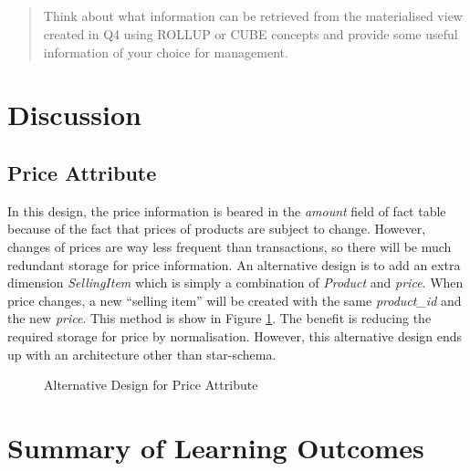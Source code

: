 \documentclass[
  a4paper,
]{article}
\begin{document}
\hypertarget{section-4}{%
\subsection{}\label{section-4}}

\begin{quote}
Think about what information can be retrieved from the materialised view
created in Q4 using ROLLUP or CUBE concepts and provide some useful
information of your choice for management.
\end{quote}

\renewcommand*{\thesubsection}{\oldsubsection}

\hypertarget{discussion}{%
\section{Discussion}\label{discussion}}

\hypertarget{price-attribute}{%
\subsection{Price Attribute}\label{price-attribute}}

In this design, the price information is beared in the \emph{amount}
field of fact table because of the fact that prices of products are
subject to change. However, changes of prices are way less frequent than
transactions, so there will be much redundant storage for price
information. An alternative design is to add an extra dimension
\emph{SellingItem} which is simply a combination of \emph{Product} and
\emph{price}. When price changes, a new ``selling item'' will be created
with the same \emph{product\_id} and the new \emph{price}. This method
is show in Figure \ref{fig:alter-price}. The benefit is reducing the
required storage for price by normalisation. However, this alternative
design ends up with an architecture other than star-schema.

\begin{figure}[htbp]
  \centering
  {
  \fontsize{10}{11}\selectfont
    \resizebox{0.85\textwidth}{!}{}
  }
  \caption{Alternative Design for Price Attribute}
  \label{fig:alter-price}
\end{figure}

\hypertarget{summary-of-learning-outcomes}{%
\section{Summary of Learning
Outcomes}\label{summary-of-learning-outcomes}}
\end{document}
